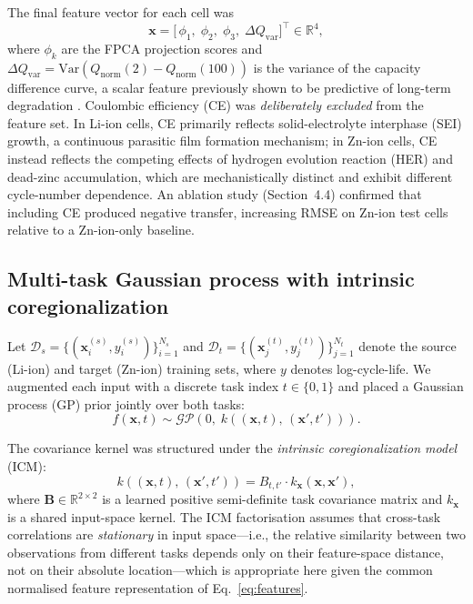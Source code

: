 The final feature vector for each cell was
\begin{equation}
  \mathbf{x} = \bigl[\,\phi_1,\;\phi_2,\;\phi_3,\;\Delta Q_{\mathrm{var}}\bigr]^{\!\top} \in \mathbb{R}^4,
  \label{eq:features}
\end{equation}
where $\phi_k$ are the FPCA projection scores and
$\Delta Q_{\mathrm{var}} = \mathrm{Var}\!\left(Q_{\mathrm{norm}}(2) - Q_{\mathrm{norm}}(100)\right)$
is the variance of the capacity difference curve, a scalar feature previously
shown to be predictive of long-term degradation \cite{severson2019}.
Coulombic efficiency (CE) was \emph{deliberately excluded} from the feature
set.  In Li-ion cells, CE primarily reflects solid-electrolyte interphase
(SEI) growth, a continuous parasitic film formation mechanism; in
Zn-ion cells, CE instead reflects the competing effects of hydrogen evolution
reaction (HER) and dead-zinc accumulation, which are mechanistically distinct
and exhibit different cycle-number dependence.  An ablation study
(Section~4.4) confirmed that including CE produced negative transfer,
increasing RMSE on Zn-ion test cells relative to a Zn-ion-only baseline.

\subsection{Multi-task Gaussian process with intrinsic coregionalization}
\label{sec:mtgp}

Let $\mathcal{D}_s = \{(\mathbf{x}_i^{(s)}, y_i^{(s)})\}_{i=1}^{N_s}$ and
$\mathcal{D}_t = \{(\mathbf{x}_j^{(t)}, y_j^{(t)})\}_{j=1}^{N_t}$ denote the
source (Li-ion) and target (Zn-ion) training sets, where $y$ denotes
log-cycle-life.  We augmented each input with a discrete task index
$t \in \{0, 1\}$ and placed a Gaussian process (GP) prior jointly over both
tasks:
\begin{equation}
  f(\mathbf{x}, t) \sim \mathcal{GP}\!\left(0,\; k\!\left((\mathbf{x},t),\,(\mathbf{x}',t')\right)\right).
  \label{eq:gp_prior}
\end{equation}

The covariance kernel was structured under the \emph{intrinsic
coregionalization model} (ICM):
\begin{equation}
  k\!\left((\mathbf{x},t),\,(\mathbf{x}',t')\right)
  = B_{t,t'} \cdot k_{\mathbf{x}}(\mathbf{x},\mathbf{x}'),
  \label{eq:icm}
\end{equation}
where $\mathbf{B} \in \mathbb{R}^{2 \times 2}$ is a learned positive
semi-definite task covariance matrix and $k_{\mathbf{x}}$ is a shared
input-space kernel.  The ICM factorisation assumes that cross-task
correlations are \emph{stationary} in input space---i.e., the relative
similarity between two observations from different tasks depends only on
their feature-space distance, not on their absolute location---which is
appropriate here given the common normalised feature representation of
Eq.~\eqref{eq:features}.

